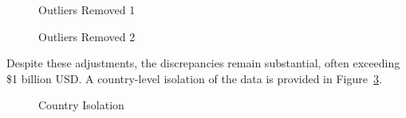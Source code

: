 \documentclass[
  11pt,
]{article}
\begin{document}
\begin{figure}[H]


\caption{\label{fig-outliers-removed-1}Outliers Removed 1}

\end{figure}%

\begin{figure}[H]


\caption{\label{fig-outliers-removed-2}Outliers Removed 2}

\end{figure}%

Despite these adjustments, the discrepancies remain substantial, often
exceeding \$1 billion USD. A country-level isolation of the data is
provided in Figure~\ref{fig-country-isolation}.

\begin{figure}[H]


\caption{\label{fig-country-isolation}Country Isolation}

\end{figure}%
\end{document}
